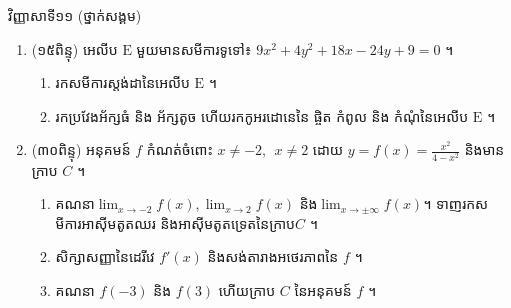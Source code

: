 \documentclass{officialexam}
\begin{document}
 
\newpage 
\maketitle 
\begin{center}
\kml
  វិញ្ញាសាទី១១ ({\kn ថ្នាក់សង្គម})\\ 
  \end{center}
    \begin{enumerate}[I]




\item (១៥ពិន្ទុ) អេលីប $\mathrm{E}$ មួយមានសមីការទូទៅ៖ $9x^2+4y^2+18x-24y+9=0$ ។ 
\begin{enumerate}[k]
\item រកសមីការស្តង់ដានៃអេលីប $\mathrm{E}$ ។
\item រកប្រវែងអ័ក្សធំ និង អ័ក្សតូច ហើយរកកូអរដោនេនៃ ផ្ចិត កំពូល និង កំណុំនៃអេលីប $\mathrm{E}$ ។
\end{enumerate}
\item (៣០ពិន្ទុ)  អនុគមន៍ $f$ កំណត់ចំពោះ $x\neq -2,\ \ x\neq 2$ ដោយ $y=f(x)=\frac{x^2}{4-x^2}$ និងមានក្រាប $C$ ។ 
		\begin{enumerate}[k]
		\item គណនា$\lim_{x\to -2}f(x), \lim_{x\to 2}f(x)$ និង$\lim_{x\to \pm \infty}f(x)$។   ទាញរកសមីការអាស៊ីមតូតឈរ និងអាស៊ីមតូតទ្រេតនៃក្រាប$C$ ។
		\item សិក្សាសញ្ញានៃដេរីវេ $f'(x)$ និងសង់តារាងអថេរភាពនៃ $f$ ។
		\item គណនា $f(-3)$ និង $f(3)$ ហើយក្រាប $C$ នៃអនុគមន៍ $f$ ។
		\end{enumerate}

\end{enumerate}
\end{document}
